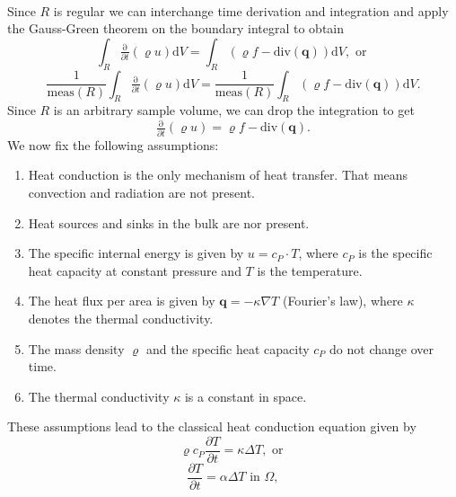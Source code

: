 \documentclass[a4paper,11pt]{article}
\theoremstyle{plain} %
\theoremstyle{definition} %
\theoremstyle{remark} %
\def\Temp{T}
\begin{document}
\\
Since $R$ is regular we can interchange time derivation and integration and apply the Gauss-Green theorem on the boundary integral to obtain
\begin{equation*}
\int_R \tfrac{\mathrm{\partial}}{\partial t}  \left( \varrho u \right) \mathrm{d} V = \int_R \left( \varrho f  -  \mathrm{div}(\boldsymbol{q}) \right) \mathrm{d} V , \text{ or }
\end{equation*}
\begin{equation*}
\frac{1}{\mathrm{meas}(R)}\int_R \tfrac{\mathrm{\partial}}{\partial t}  \left( \varrho u \right) \mathrm{d} V = \frac{1}{\mathrm{meas}(R)} \int_R \left( \varrho f  -  \mathrm{div}(\boldsymbol{q}) \right) \mathrm{d} V.
\end{equation*}
Since $R$ is an arbitrary sample volume, we can drop the integration to get
\begin{equation*}
\tfrac{\mathrm{\partial}}{\partial t}  \left( \varrho u \right) = \varrho f  -  \mathrm{div}(\boldsymbol{q}) .
\end{equation*}
We now fix the following assumptions:
\begin{enumerate}
\item[(A1)] Heat conduction is the only mechanism of heat transfer. That means convection and radiation are not present.
\item[(A2)] Heat sources and sinks in the bulk are nor present.
\item[(A3)] The specific internal energy is given by $u = c_P \cdot\Temp$, where $c_P$ is the specific heat capacity at constant pressure and $T$ is the temperature.
\item[(A4)] The heat flux per area is given by $ \boldsymbol{q} = - \kappa \nabla T $ (Fourier's law), where $\kappa $ denotes the thermal conductivity.
\item[(A5)] The mass density $\varrho $ and the specific heat capacity $c_P$ do not change over time.
\item[(A6)] The thermal conductivity $\kappa $ is a constant in space.
\end{enumerate}
These assumptions lead to the classical heat conduction equation given by
\begin{equation}
\varrho c_P \frac{\partial \Temp}{\partial t} = \kappa \Delta \Temp , \text{ or }
\end{equation}
\begin{equation}
\frac{\partial T}{\partial t} = \alpha \Delta \Temp \text{ in } \Omega ,
\end{equation}
\end{document}
